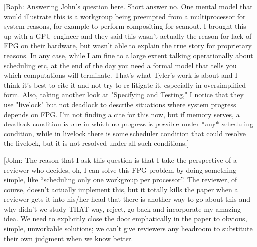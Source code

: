 \documentclass[sigconf]{acmart}
\newcommand{\john}[1]{{\footnotesize\color{cyan}[John: #1]}}
\newcommand{\raph}[1]{{\footnotesize\color{magenta}[Raph: #1]}}
\begin{document}
\raph{Answering John's question here. Short answer no. One mental model that would illustrate this is a workgroup being preempted from a multiprocessor for system reasons, for example to perform compositing for scanout. I brought this up with a GPU engineer and they said this wasn't actually the reason for lack of FPG on their hardware, but wasn't able to explain the true story for proprietary reasons. In any case, while I am fine to a large extent talking operationally about scheduling etc, at the end of the day you need a formal model that tells you which computations will terminate. That's what Tyler's work is about and I think it's best to cite it and not try to re-litigate it, especially in oversimplified form. Also, taking another look at "Specifying and Testing," I notice that they use "livelock" but not deadlock to describe situations where system progress depends on FPG. I'm not finding a cite for this now, but if memory serves, a deadlock condition is one in which no progress is possible under *any* scheduling condition, while in livelock there is some scheduler condition that could resolve the livelock, but it is not resolved under all such conditions.}

\john{The reason that I ask this question is that I take the perspective of a reviewer who decides, oh, I can solve this FPG problem by doing something simple, like ``scheduling only one workgroup per processor''. The reviewer, of course, doesn't actually implement this, but it totally kills the paper when a reviewer gets it into his/her head that there is another way to go about this and why didn't we study THAT way, reject, go back and incorporate my amazing idea. We need to explicitly close the door emphatically in the paper to obvious, simple, unworkable solutions; we can't give reviewers any headroom to substitute their own judgment when we know better.}
\end{document}
